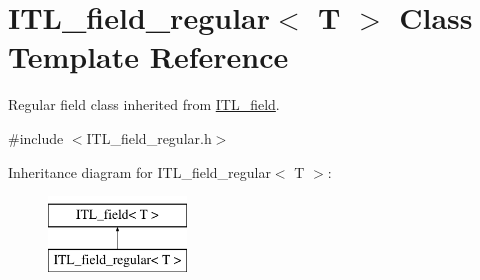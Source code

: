 \hypertarget{classITL__field__regular}{
\section{ITL\_\-field\_\-regular$<$ T $>$ Class Template Reference}
\label{classITL__field__regular}
}


Regular field class inherited from \hyperlink{classITL__field}{ITL\_\-field}.  




{\ttfamily \#include $<$ITL\_\-field\_\-regular.h$>$}

Inheritance diagram for ITL\_\-field\_\-regular$<$ T $>$:\begin{figure}[H]
\begin{center}
\leavevmode
\includegraphics[height=2cm]{classITL__field__regular}
\end{center}
\end{figure}
